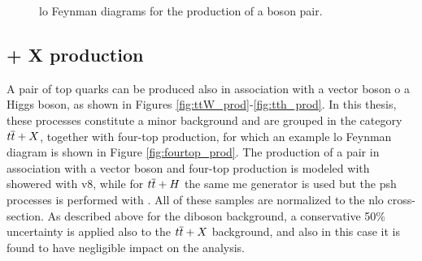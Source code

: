 \begin{figure}[h]
\centering 
{}
\caption{\gls{lo} Feynman diagrams for the production of a boson pair.}\label{fig:dib_prod}
\end{figure}


\subsection{\ttbar + X production}

A pair of top quarks can be produced also in association with a vector boson o a Higgs boson, as shown in Figures \ref{fig:ttW_prod}-\ref{fig:tth_prod}.
In this thesis, these processes constitute a minor background and are grouped in the category $t\overline{t}+X$, together with four-top production,
for which an example \gls{lo} Feynman diagram is shown in Figure \ref{fig:fourtop_prod}. 
The production of a \ttbar pair in association with a vector boson and four-top production is modeled with \aNLO showered with \PY v8, while for $t\overline{t}+H$ the same 
\gls{me} generator is used but the \gls{psh} processes is performed with \HWpp. 
All of these samples are normalized to the \gls{nlo} cross-section.
As described above for the diboson background, a conservative 50\% uncertainty is applied also to the 
$t\overline{t}+X$ background, and also in this case it is found to have negligible impact on the analysis. 

